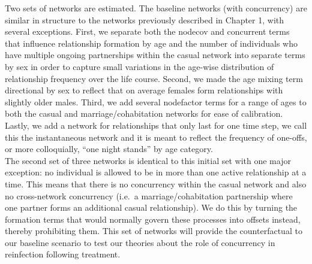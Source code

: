 \documentclass [11pt, proquest] {uwthesis}[2015/03/03]
\begin{document}
Two sets of networks are estimated. The baseline networks (with concurrency) are similar in structure to the networks previously described in Chapter 1, with several exceptions. First, we separate both the nodecov and concurrent terms that influence relationship formation by age and the number of individuals who have multiple ongoing partnerships within the casual network into separate terms by sex in order to capture small variations in the age-wise distribution of relationship frequency over the life course. Second, we made the age mixing term directional by sex to reflect that on average females form relationships with slightly older males. Third, we add several nodefactor terms for a range of ages to both the casual and marriage/cohabitation networks for ease of calibration. Lastly, we add a network for relationships that only last for one time step, we call this the instantaneous network and it is meant to reflect the frequency of one-offs, or more colloquially, ``one night stands'' by age category.\\
The second set of three networks is identical to this initial set with one major exception: no individual is allowed to be in more than one active relationship at a time. This means that there is no concurrency within the casual network and also no cross-network concurrency (i.e.~a marriage/cohabitation partnership where one partner forms an additional casual relationship). We do this by turning the formation terms that would normally govern these processes into offsets instead, thereby prohibiting them. This set of networks will provide the counterfactual to our baseline scenario to test our theories about the role of concurrency in reinfection following treatment.
\end{document}

